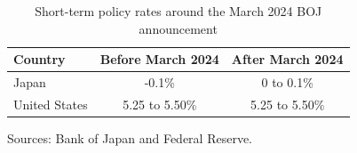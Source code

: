 \documentclass[12pt]{article}
\begin{document}
\vspace{2em}

\begin{table}[h!]
\centering
\caption{Short-term policy rates around the March 2024 BOJ announcement}
\label{tab:policy_rates}
\begin{tabular}{lcc}
\toprule
Country & Before March 2024 & After March 2024 \\
\midrule
Japan & -0.1\% & 0 to 0.1\% \\
United States & 5.25 to 5.50\% & 5.25 to 5.50\% \\
\bottomrule
\end{tabular}

\vspace{0.75em}
\begin{minipage}{0.9\textwidth}
\begin{singlespace}
\footnotesize
Sources: Bank of Japan and Federal Reserve.
\end{singlespace}
\end{minipage}
\end{table}
\end{document}

